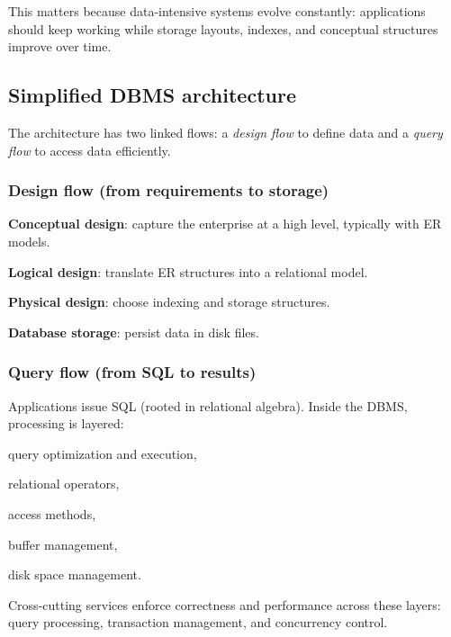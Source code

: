 \documentclass[../../dis.tex]{subfiles}
\begin{document}
This matters because data-intensive systems evolve constantly: applications should keep working while storage layouts, indexes, and conceptual structures improve over time.

\subsection{Simplified DBMS architecture}
The architecture has two linked flows: a \emph{design flow} to define data and a \emph{query flow} to access data efficiently.

\begin{minipage}[t]{0.49\textwidth}
\subsubsection*{Design flow (from requirements to storage)}
\begin{dashlist}
    \item \textbf{Conceptual design}: capture the enterprise at a high level, typically with ER models.
    \item \textbf{Logical design}: translate ER structures into a relational model.
    \item \textbf{Physical design}: choose indexing and storage structures.
    \item \textbf{Database storage}: persist data in disk files.
\end{dashlist}
\end{minipage}
\hfill
\begin{minipage}[t]{0.49\textwidth}
\subsubsection*{Query flow (from SQL to results)}
Applications issue SQL (rooted in relational algebra). Inside the DBMS, processing is layered:
\begin{dashlist}
    \item query optimization and execution,
    \item relational operators,
    \item access methods,
    \item buffer management,
    \item disk space management.
\end{dashlist}
\end{minipage}

Cross-cutting services enforce correctness and performance across these layers: query processing, transaction management, and concurrency control.
\end{document}
